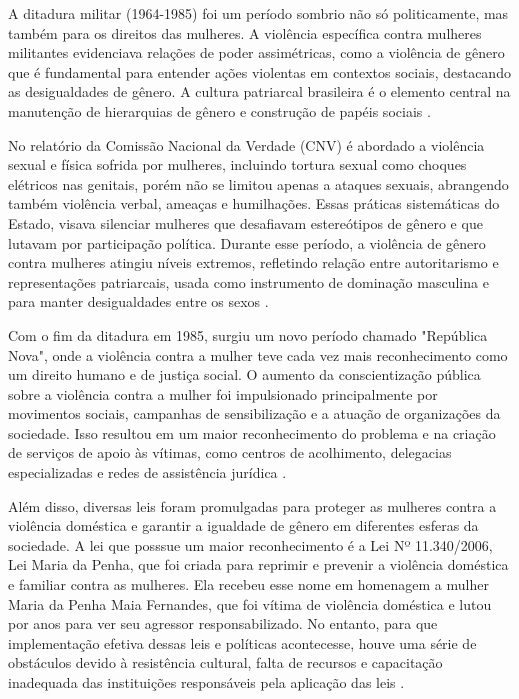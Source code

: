 \documentclass[
    article,			%
    12pt,				%
    oneside,            %
    a4paper,			%
    english,			%
    brazil,				%
    ]{abntex2}
\begin{document}
    A ditadura militar (1964-1985) foi um período sombrio não só politicamente, mas também para os direitos das mulheres. A violência específica contra mulheres militantes evidenciava relações de poder assimétricas, como a violência de gênero que é fundamental para entender ações violentas em contextos sociais, destacando as desigualdades de gênero. A cultura patriarcal brasileira é o elemento central na manutenção de hierarquias de gênero e construção de papéis sociais \cite{ditadura_2019}. 
    
    No relatório da Comissão Nacional da Verdade (CNV) é abordado a violência sexual e física sofrida por mulheres, incluindo tortura sexual como choques elétricos nas genitais, porém não se limitou apenas a ataques sexuais, abrangendo também violência verbal, ameaças e humilhações. Essas práticas sistemáticas do Estado, visava silenciar mulheres que desafiavam estereótipos de gênero e que lutavam por participação política. Durante esse período, a violência de gênero contra mulheres atingiu níveis extremos, refletindo relação entre autoritarismo e representações patriarcais, usada como instrumento de dominação masculina e para manter desigualdades entre os sexos \cite{ditaduraBR_2020}.

    Com o fim da ditadura em 1985, surgiu um novo período chamado "República Nova", onde a violência contra a mulher teve cada vez mais reconhecimento como um direito humano e de justiça social. O aumento da conscientização pública sobre a violência contra a mulher foi impulsionado principalmente por movimentos sociais, campanhas de sensibilização e a atuação de organizações da sociedade. Isso resultou em um maior reconhecimento do problema e na criação de serviços de apoio às vítimas, como centros de acolhimento, delegacias especializadas e redes de assistência jurídica \cite{15anosLMP_2022} \cite{LMPavanços_2016}.
    
    Além disso, diversas leis foram promulgadas para proteger as mulheres contra a violência doméstica e garantir a igualdade de gênero em diferentes esferas da sociedade. A lei que posssue um maior reconhecimento é a Lei Nº 11.340/2006, Lei Maria da Penha, que foi criada para reprimir e prevenir a violência doméstica e familiar contra as mulheres. Ela recebeu esse nome em homenagem a mulher Maria da Penha Maia Fernandes, que foi vítima de violência doméstica e lutou por anos para ver seu agressor responsabilizado. No entanto, para que implementação efetiva dessas leis e políticas acontecesse, houve uma série de obstáculos devido à resistência cultural, falta de recursos e capacitação inadequada das instituições responsáveis pela aplicação das leis \cite{15anosLMP_2022} \cite{LMPavanços_2016}.
\end{document}
